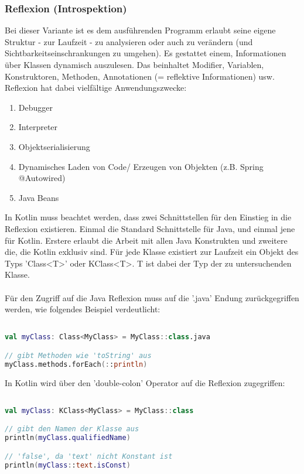 \subsubsection{Reflexion (Introspektion)}
Bei dieser Variante ist es dem ausführenden Programm erlaubt seine eigene Struktur - zur Laufzeit - zu analysieren oder auch zu verändern (und Sichtbarkeitseinschrankungen zu umgehen). Es gestattet einem, Informationen über Klassen dynamisch auszulesen. Das beinhaltet Modifier, Variablen, Konstruktoren, Methoden, Annotationen (= reflektive Informationen) usw. Reflexion hat dabei vielfältige Anwendungszwecke:
\begin{enumerate}
	\item Debugger
	\item Interpreter
	\item Objektserialisierung
	\item Dynamisches Laden von Code/ Erzeugen von Objekten (z.B. Spring @Autowired)
	\item Java Beans
\end{enumerate}
\bigskip
In Kotlin muss beachtet werden, dass zwei Schnittstellen für den Einstieg in die Reflexion existieren. Einmal die Standard Schnittstelle für Java, und einmal jene für Kotlin. Erstere erlaubt die Arbeit mit allen Java Konstrukten und zweitere die, die Kotlin exklusiv sind. Für jede Klasse existiert zur Laufzeit ein Objekt des Typs 'Class<T>' oder KClass<T>. T ist dabei der Typ der zu untersuchenden Klasse.
\\
\\
Für den Zugriff auf die Java Reflexion muss auf die '.java' Endung zurückgegriffen werden, wie folgendes Beispiel verdeutlicht:
\begin{lstlisting}[caption={Java Reflexion}, label={lst:data-class}, language=Kotlin]

val myClass: Class<MyClass> = MyClass::class.java

// gibt Methoden wie 'toString' aus
myClass.methods.forEach(::println)
\end{lstlisting}
\bigskip
In Kotlin wird über den 'double-colon' Operator auf die Reflexion zugegriffen:
\begin{lstlisting}[caption={Kotlin Reflexion}, label={lst:data-class}, language=Kotlin]

val myClass: KClass<MyClass> = MyClass::class

// gibt den Namen der Klasse aus
println(myClass.qualifiedName)

// 'false', da 'text' nicht Konstant ist
println(myClass::text.isConst)
\end{lstlisting}
